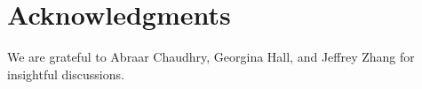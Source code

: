 \documentclass[12pt]{article}
\newcommand{\reals}{\mathbb{R}}
\newcommand{\DiSOS}{\mathbf{\Sigma}}
\newcommand{\defeq}{\coloneq}
\newcommand{\st}{\text{s.t.}}
\newcommand{\mcD}{\mathcal{D}}
\theoremstyle{remark}
\begin{document}



\section*{Acknowledgments}
We are grateful to Abraar Chaudhry, Georgina Hall, and Jeffrey Zhang for insightful discussions.
\end{document}
